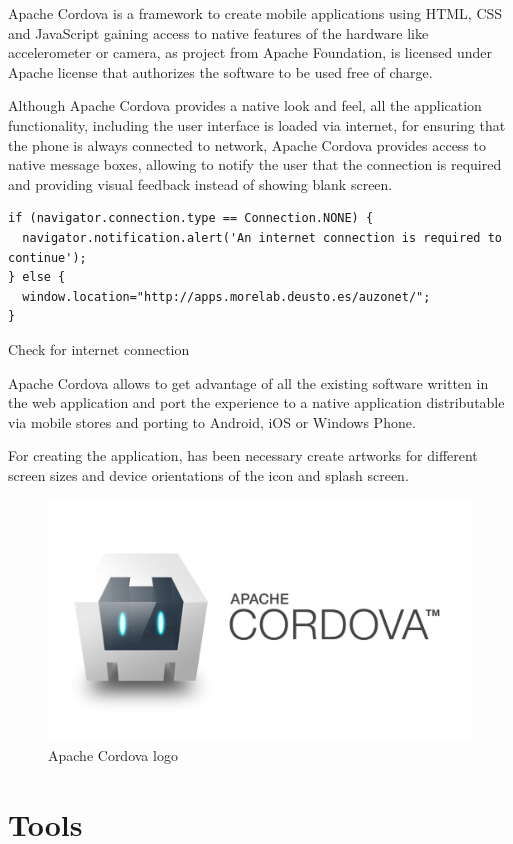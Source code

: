 \documentclass{DeustoFDP}
\begin{document}
Apache Cordova is a framework to create mobile applications using HTML, CSS and JavaScript gaining access to native features of the hardware like accelerometer or camera, as project from Apache Foundation, is licensed under Apache license that authorizes the software to be used free of charge.

Although Apache Cordova provides a native look and feel, all the application functionality, including the user interface is loaded via internet, for ensuring that the phone is always connected to network, Apache Cordova provides access to native message boxes, allowing to notify the user that the connection is required and providing visual feedback instead of showing blank screen.

\begin{listing}[!h]\centering 
	\begin{minipage}{.9\textwidth}
		\begin{verbatim}
if (navigator.connection.type == Connection.NONE) {
  navigator.notification.alert('An internet connection is required to continue');
} else {
  window.location="http://apps.morelab.deusto.es/auzonet/";
}
		\end{verbatim}
	\end{minipage}
	\caption{Check for internet connection}\label{lst:internetcheck}
\end{listing}

Apache Cordova \cite{Cordova} allows to get advantage of all the existing software written in the web application and port the experience to a native application distributable via mobile stores and porting to Android, iOS or Windows Phone.

For creating the application, has been necessary create artworks for different screen sizes and device orientations of the icon and splash screen.

\begin{figure}[h]
\centering
\includegraphics[width=0.4\linewidth]{fig/cordova}
\caption[Apache Cordova logo]{Apache Cordova logo}
\label{fig:cordova}
\end{figure}

\section{Tools}
\end{document}
